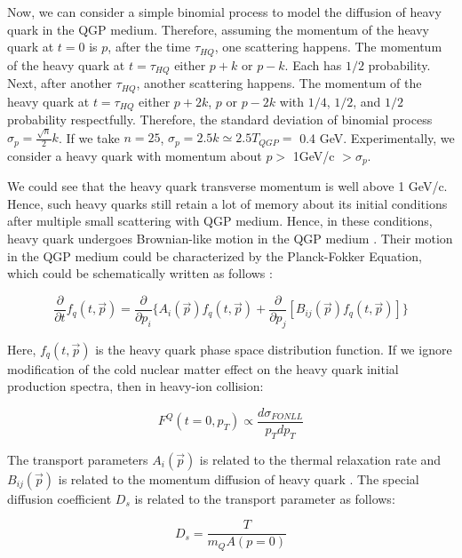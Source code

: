 Now, we can consider a simple binomial process to model the diffusion of heavy quark in the QGP medium. Therefore, assuming the momentum of the heavy quark at $t = 0$ is $p$, after the time $\tau_{HQ}$, one scattering happens. The momentum of the heavy quark at $t = \tau_{HQ}$ either $p + k$ or $p - k$. Each has $1/2$ probability. Next, after another $\tau_{HQ}$, another scattering happens. The momentum of the heavy quark at $t = \tau_{HQ}$ either $p + 2k$, $p$ or $p - 2k$ with $1/4$, $1/2$, and $1/2$ probability respectfully. Therefore, the standard deviation of binomial process $\sigma_p = \frac{\sqrt{n}}{2} k$. If we take $n = 25$, $\sigma_p = 2.5k \simeq 2.5 T_{QGP} =$ 0.4 GeV. Experimentally, we consider a heavy quark with momentum about $p  > $ 1GeV/c $> \sigma_p$. 






We could see that the heavy quark transverse momentum is well above 1 GeV/c. Hence, such heavy quarks still retain a lot of memory about its initial conditions after multiple small scattering with QGP medium. Hence, in these conditions, heavy quark undergoes Brownian-like motion in the QGP medium \cite{HQReview}. Their motion in the QGP medium could be characterized by the Planck-Fokker Equation, which could be schematically written as follows \cite{HQRaff}:

\begin{equation}
\frac{\partial}{\partial t} f_q(t, \vec{p}) = \frac{\partial}{\partial p_{i}} \{ A_i(\vec p) f_q(t,\vec{p}) + \frac{\partial}{\partial p_j}[B_{ij}(\vec{p})f_q(t,\vec{p}) ] \}
\end{equation}

Here, $f_q(t,\vec{p})$ is the heavy quark phase space distribution function. If we ignore modification of the cold nuclear matter effect on the heavy quark initial production spectra, then in heavy-ion collision:

\begin{equation}
F^Q( t = 0,p_T) \propto \frac{d\sigma_{FONLL}}{p_Tdp_T}
\end{equation}


The transport parameters $A_i(\vec{p})$ is related to the thermal relaxation rate and $B_{ij}(\vec{p})$ is related to the momentum diffusion of heavy quark \cite{HQReview}. The special diffusion coefficient $D_s$ is related to the transport parameter as follows:

\begin{equation}
D_s = \frac{T} {m_Q A(p=0)}
\end{equation}

